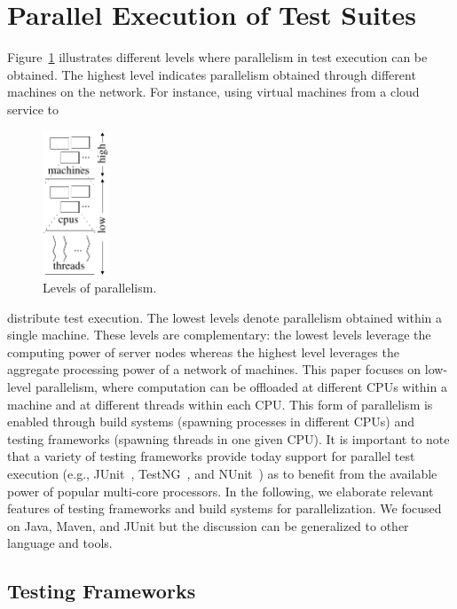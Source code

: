 \documentclass[10pt,journal,compsoc]{IEEEtran}
\begin{document}
\section{\label{sec:background}Parallel Execution of Test Suites}
Figure~\ref{fig:levels} illustrates different levels where
parallelism in test execution can be obtained.
The highest level indicates
parallelism obtained through different machines on the
network.  For instance, using virtual machines from a cloud service to
\begin{figure}  
  \vspace{-2mm}
  \centering
  \includegraphics[width=2cm]{figs/parallel-levels-short.pdf}  
  \caption{\label{fig:levels}Levels of parallelism.}
  \vspace{-2mm}
\end{figure}

distribute test execution.  The lowest levels denote parallelism
obtained within a single machine.  These levels are complementary:
the lowest levels leverage the computing power of server
nodes whereas the highest level leverages the aggregate processing
power of a network of machines.
This paper focuses on low-level parallelism, where computation can be
offloaded at different CPUs within a machine and at different threads
within each CPU.  This form of parallelism is enabled through build
systems (spawning processes in different CPUs) and testing frameworks
(spawning threads in one given CPU).  It is important to note that a variety
of testing frameworks provide today support for parallel test
execution (e.g., JUnit~\cite{junit-org}, TestNG~\cite{testng}, and
NUnit~\cite{nunit}) as to benefit from the available power of popular multi-core processors.
In the following, we elaborate relevant features of testing frameworks
and build systems for parallelization.  We focused on Java, Maven, and JUnit but the
discussion can be generalized to other language and tools.

\subsection{Testing Frameworks}
\label{sec:frameworks}
\end{document}
